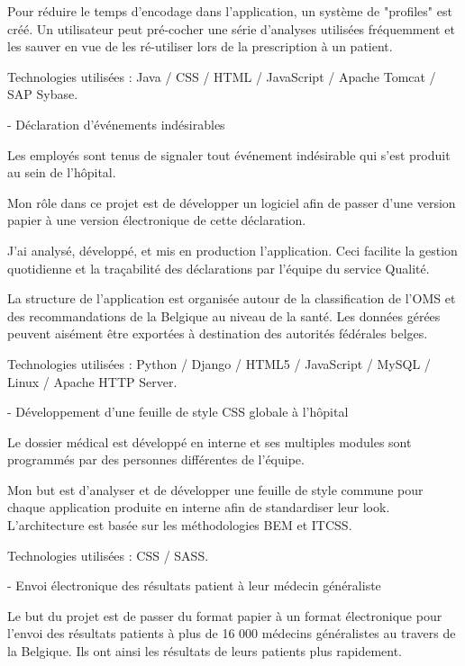 \begin{cventries}
{    Pour réduire le temps d'encodage dans l'application, un système de "profiles" est créé. Un utilisateur peut pré-cocher une série d'analyses utilisées fréquemment et les sauver en vue de les ré-utiliser lors de la prescription à un patient. 

    Technologies utilisées : Java / CSS / HTML / JavaScript / Apache Tomcat / SAP Sybase.

    }
    
    
    
    
  \cventry
    {-} %
    {Déclaration d'événements indésirables} %
    {} %
    {} %
    {
    Les employés sont tenus de signaler tout événement indésirable qui s'est produit au sein de l'hôpital.
    
    Mon rôle dans ce projet est de développer un logiciel afin de passer d'une version papier à une version électronique de cette déclaration.
    
    J'ai analysé, développé, et mis en production l'application.
    Ceci facilite la gestion quotidienne et la traçabilité des déclarations par l'équipe du service Qualité.
    
    La structure de l'application est organisée autour de la classification de l'OMS et des recommandations de la Belgique au niveau de la santé. Les données gérées peuvent aisément être exportées à destination des autorités fédérales belges.

    Technologies utilisées : Python / Django / HTML5 / JavaScript / MySQL / Linux / Apache HTTP Server.

    }
    
    
  \cventry
    {-} %
    {Développement d'une feuille de style CSS globale à l'hôpital} %
    {} %
    {} %
    {
    Le dossier médical est développé en interne et ses multiples modules sont programmés par des personnes différentes de l'équipe.
    
    Mon but est d'analyser et de développer une feuille de style commune pour chaque application produite en interne afin de standardiser leur look. L'architecture est basée sur les méthodologies BEM et ITCSS.


    Technologies utilisées : CSS / SASS.

    }
    
    
  \cventry
    {-} %
    {Envoi électronique des résultats patient à leur médecin généraliste} %
    {} %
    {} %
    {
    Le but du projet est de passer du format papier à un format électronique pour l'envoi des résultats patients à plus de 16 000 médecins généralistes au travers de la Belgique. Ils ont ainsi les résultats de leurs patients plus rapidement.
    
}
\end{cventries}

